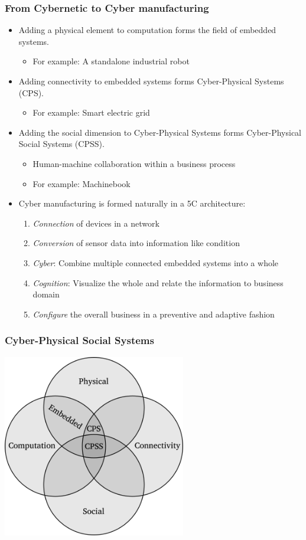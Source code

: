 \documentclass[8pt]{beamer}
\begin{document}
\begin{frame}
\frametitle{From Cybernetic to Cyber manufacturing}
\begin{itemize}
 \item Adding a physical element to computation forms the field of embedded systems.
\begin{itemize}
 \item For example: A standalone industrial robot
\end{itemize}
 \item Adding connectivity to embedded systems forms Cyber-Physical Systems (CPS).
\begin{itemize}
 \item For example: Smart electric grid
\end{itemize}
 \item Adding the social dimension to Cyber-Physical Systems forms Cyber-Physical Social Systems (CPSS).
\begin{itemize}
 \item Human-machine collaboration within a business process
 \item For example: Machinebook
\end{itemize}
 \item Cyber manufacturing is formed naturally in a 5C architecture:
\begin{enumerate}
 \item \emph{Connection} of devices in a network
 \item \emph{Conversion} of sensor data into information like condition
 \item \emph{Cyber}: Combine multiple connected embedded systems into a whole
 \item \emph{Cognition}: Visualize the whole and relate the information to business domain
 \item \emph{Configure} the overall business in a preventive and adaptive fashion
\end{enumerate}
\end{itemize}
\end{frame}

\begin{frame}
\frametitle{Cyber-Physical Social Systems}
\includegraphics[width=0.6\textwidth]{./cpss.png}
\end{frame}
\end{document}
